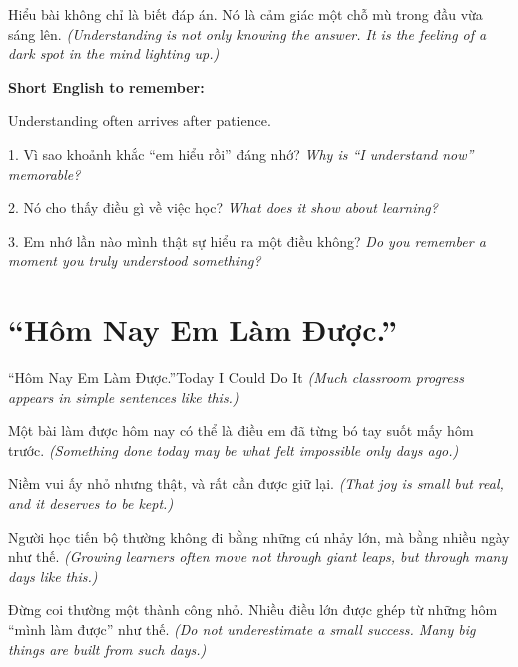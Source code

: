 \begin{baihoc}
Hiểu bài không chỉ là biết đáp án. Nó là cảm giác một chỗ mù trong đầu vừa sáng lên.
\textit{(Understanding is not only knowing the answer. It is the feeling of a dark spot in the mind lighting up.)}
\end{baihoc}

\begin{ghinhoanh}
\textbf{Short English to remember:}

Understanding often arrives after patience.

\end{ghinhoanh}

\begin{tuhocnhanh}
1. Vì sao khoảnh khắc ``em hiểu rồi'' đáng nhớ? \textit{Why is ``I understand now'' memorable?}

2. Nó cho thấy điều gì về việc học? \textit{What does it show about learning?}

3. Em nhớ lần nào mình thật sự hiểu ra một điều không? \textit{Do you remember a moment you truly understood something?}
\end{tuhocnhanh}
\ngancach

\section{``Hôm Nay Em Làm Được.''}
\begin{truyen}{``Hôm Nay Em Làm Được.''}{Today I Could Do It}
\textit{(Much classroom progress appears in simple sentences like this.)}

Một bài làm được hôm nay có thể là điều em đã từng bó tay suốt mấy hôm trước.
\textit{(Something done today may be what felt impossible only days ago.)}

Niềm vui ấy nhỏ nhưng thật, và rất cần được giữ lại.
\textit{(That joy is small but real, and it deserves to be kept.)}

Người học tiến bộ thường không đi bằng những cú nhảy lớn, mà bằng nhiều ngày như thế.
\textit{(Growing learners often move not through giant leaps, but through many days like this.)}
\end{truyen}

\begin{baihoc}
Đừng coi thường một thành công nhỏ. Nhiều điều lớn được ghép từ những hôm ``mình làm được'' như thế.
\textit{(Do not underestimate a small success. Many big things are built from such days.)}
\end{baihoc}

